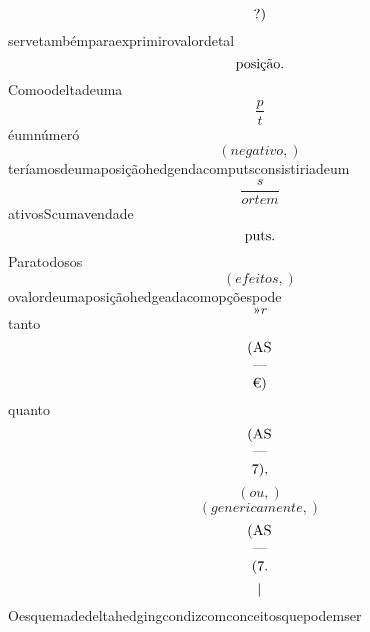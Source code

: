 \documentclass{article}
\begin{document}
\begin{equation}
$?)$
\end{equation}servetambémparaexprimirovalordetal\begin{equation}
$posição.$
\end{equation}Comoodeltadeuma\begin{equation}
\frac{p}{t}
\end{equation}éumnúmeró\begin{equation}
\left( negativo,\right)
\end{equation}teríamosdeumaposiçãohedgendacomputsconsistiriadeum\begin{equation}
\frac{s}{ortem}
\end{equation}ativosScumavendade\begin{equation}
$puts.$
\end{equation}Paratodosos\begin{equation}
\left( efeitos,\right)
\end{equation}ovalordeumaposiçãohedgeadacomopçõespode\begin{equation}
»r
\end{equation}tanto\begin{equation}
$(AS$
\end{equation}\begin{equation}
—
\end{equation}\begin{equation}
$€)$
\end{equation}quanto\begin{equation}
$(AS$
\end{equation}\begin{equation}
—
\end{equation}\begin{equation}
$7),$
\end{equation}\begin{equation}
\left( ou,\right)
\end{equation}\begin{equation}
\left( genericamente,\right)
\end{equation}\begin{equation}
$(AS$
\end{equation}\begin{equation}
—
\end{equation}\begin{equation}
$(7.$
\end{equation}\begin{equation}
$|$
\end{equation}Oesquemadedeltahedgingcondizcomconceitosquepodemser\begin{equation}

\end{equation}
\end{document}

